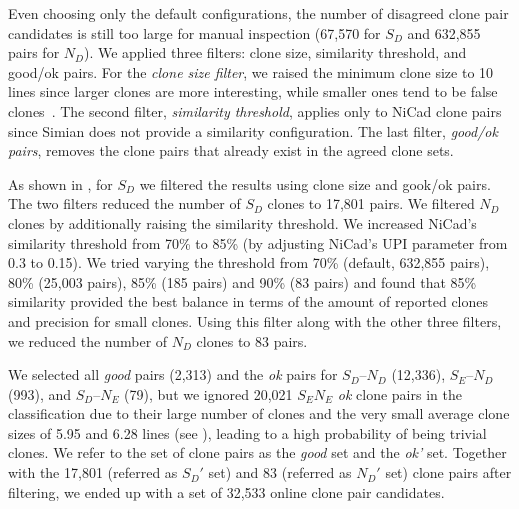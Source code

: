 \documentclass[sigconf,review, anonymous]{acmart}
\begin{document}
Even choosing only the default configurations, the number of disagreed
clone pair candidates is still too large for manual inspection (67,570
for $S_D$ and 632,855 pairs for $N_D$). We applied three filters: clone
size, similarity threshold, and good/ok pairs. For
the \emph{clone size filter}, we raised the minimum clone size to 10 lines
since larger clones are more interesting, while smaller ones tend to
be false clones~\cite{Saini2016}.
The second filter, \emph{similarity threshold}, applies
only to NiCad clone pairs since Simian does not provide a similarity
configuration. The last filter, \emph{good/ok pairs}, removes the
clone pairs that already exist in the agreed clone sets.

As shown in , for $S_D$ we filtered the
results using clone size and gook/ok pairs. The
two filters reduced the number of $S_D$ clones to 17,801 pairs. We
filtered $N_D$ clones by additionally raising the similarity
threshold. We increased NiCad's similarity threshold from 70\% to 85\%
(by adjusting NiCad's $\mathrm{UPI}$ parameter from 0.3 to 0.15). We
tried varying the threshold from 70\% (default, 632,855 pairs), 80\%
(25,003 pairs), 85\% (185 pairs) and 90\% (83 pairs) and found that
85\% similarity provided the best balance in terms of the amount of
reported clones and precision for small clones. Using this filter
along with the other three filters, we reduced the number of $N_D$
clones to 83 pairs.

We selected all \textit{good} pairs (2,313) and the \textit{ok} pairs for
$S_D$--$N_D$ (12,336), $S_E$--$N_D$ (993), and $S_D$--$N_E$ (79), but we ignored
20,021 $S_EN_E$ \textit{ok} clone pairs in the classification due to
their large number of clones and the very small average clone sizes of
5.95 and 6.28 lines (see ), leading to a high
probability of being trivial clones. We refer to the set of clone
pairs as the \textit{good} set and the \textit{ok'} set.
Together with the 17,801 (referred as $S_D'$ set) and 83 (referred as
$N_D'$ set) clone pairs after filtering, we ended up with a set of 32,533 online clone pair candidates.
\end{document}
